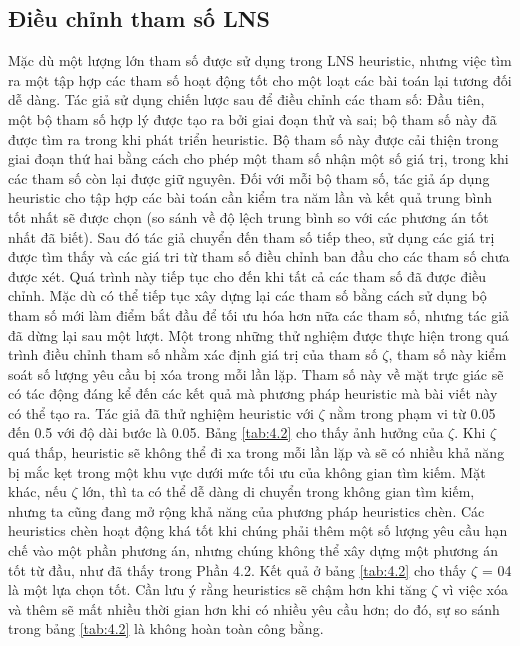 \subsection{Điều chỉnh tham số LNS}
Mặc dù một lượng lớn tham số được sử dụng trong LNS heuristic, nhưng việc tìm ra một tập hợp các tham số hoạt động tốt cho một loạt các bài toán lại tương đối dễ dàng. Tác giả sử dụng chiến lược sau để điều chỉnh các tham số: Đầu tiên, một bộ tham số hợp lý được tạo ra bởi giai đoạn thử và sai; bộ tham số này đã được tìm ra trong khi phát triển heuristic. Bộ tham số này được cải thiện trong giai đoạn thứ hai bằng cách cho phép một tham số nhận một số giá trị, trong khi các tham số còn lại được giữ nguyên. Đối với mỗi bộ tham số, tác giả áp dụng heuristic cho tập hợp các bài toán cần kiểm tra năm lần và kết quả trung bình tốt nhất sẽ được chọn (so sánh về độ lệch trung bình so với các phương án tốt nhất đã biết). Sau đó tác giả chuyển đến tham số tiếp theo, sử dụng các giá trị được tìm thấy và các giá tri từ tham số điều chỉnh ban đầu cho các tham số chưa được xét. Quá trình này tiếp tục cho đến khi tất cả các tham số đã được điều chỉnh. Mặc dù có thể tiếp tục xây dựng lại các tham số bằng cách sử dụng bộ tham số mới làm điểm bắt đầu để tối ưu hóa hơn nữa các tham số, nhưng tác giả đã dừng lại sau một lượt.
Một trong những thử nghiệm được thực hiện trong quá trình điều chỉnh tham số nhằm xác định giá trị của tham số $\zeta$, tham số này kiểm soát số lượng yêu cầu bị xóa trong mỗi lần lặp. Tham số này về mặt trực giác sẽ có tác động đáng kể đến các kết quả mà phương pháp heuristic mà bài viết này có thể tạo ra. Tác giả đã thử nghiệm heuristic với $\zeta$ nằm trong phạm vi từ 0.05 đến 0.5 với độ dài bước là 0.05. Bảng \ref{tab:4.2} cho thấy ảnh hưởng của $\zeta$. Khi $\zeta$ quá thấp, heuristic sẽ không thể đi xa trong mỗi lần lặp và sẽ có nhiều khả năng bị mắc kẹt trong một khu vực dưới mức tối ưu của không gian tìm kiếm. Mặt khác, nếu $\zeta$ lớn, thì ta có thể dễ dàng di chuyển trong không gian tìm kiếm, nhưng ta cũng đang mở rộng khả năng của phương pháp heuristics chèn. Các heuristics chèn hoạt động khá tốt khi chúng phải thêm một số lượng yêu cầu hạn chế vào một phần phương án, nhưng chúng không thể xây dựng một phương án tốt từ đầu, như đã thấy trong Phần 4.2. Kết quả ở bảng \ref{tab:4.2} cho thấy $\zeta$ = 04 là một lựa chọn tốt. Cần lưu ý rằng heuristics sẽ chậm hơn khi tăng $\zeta$ vì việc xóa và thêm sẽ mất nhiều thời gian hơn khi có nhiều yêu cầu hơn; do đó, sự so sánh trong bảng \ref{tab:4.2} là không hoàn toàn công bằng.

